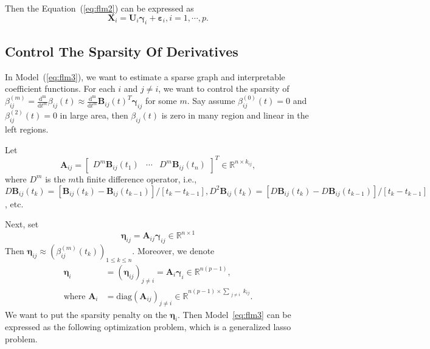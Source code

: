 \documentclass[11pt]{article}
\newcommand{\R}{\mathbb R}
\newcommand{\bX}{\mathbf X}
\newcommand{\bA}{\mathbf A}
\newcommand{\bB}{\mathbf B}
\newcommand{\bU}{\mathbf U}
\newcommand{\bseta}{\boldsymbol{\eta}}
\newcommand{\bvarepsilon}{\boldsymbol{\varepsilon}}
\newcommand{\bgamma}{\boldsymbol{\gamma}}
\begin{document}
Then the Equation~(\ref{eq:flm2}) can be expressed as
\begin{equation}
	\label{eq:flm3}
	\bX_i = \bU_i \bgamma_i + \bvarepsilon_i, i = 1, \cdots, p.
\end{equation}
 
\subsection{Control The Sparsity Of Derivatives}

In Model~(\ref{eq:flm3}), we want to estimate a sparse graph and interpretable coefficient functions. For each $i$ and $j \neq i$, we want to control the sparsity of $ \beta_{ij}^{(m)} = \frac{\mathrm{d^m}}{\mathrm{d} t^m} \beta_{ij}(t) \approx \frac{\mathrm{d^m}}{\mathrm{d} t^m} \bB_{ij}(t)^T \bgamma_{ij}$ for some $m$. Say assume $\beta_{ij}^{(0)}(t) = 0$ and $\beta_{ij}^{(2)}(t) = 0$ in large area, then $\beta_{ij}(t)$ is zero in many region and linear in the left regions.

Let 
\begin{equation}
	\bA_{ij} = \begin{bmatrix} D^m\bB_{ij}(t_1) & \cdots & D^m\bB_{ij}(t_n) \end{bmatrix}^T \in \R^{n \times k_{ij}},
\end{equation} 
where $D^m$ is the $m$th finite difference operator, i.e., $D\bB_{ij}(t_k) = [\bB_{ij}(t_k) - \bB_{ij}(t_{k-1})]/[t_k - t_{k-1}], D^2\bB_{ij}(t_k) = [D\bB_{ij}(t_k) - D\bB_{ij}(t_{k-1})]/[t_k - t_{k-1}]$, etc. 

Next, set
\begin{equation}
	\bseta_{ij} = \bA_{ij} \bgamma_{ij} \in \R^{n \times 1}  
\end{equation}
Then $\bseta_{ij} \approx (\beta_{ij}^{(m)}(t_k))_{1 \leq k \leq n}$. Moreover, we denote 
\begin{equation}
	\begin{aligned}
	\bseta_i &= (\bseta_{ij})_{j \neq i} = \bA_i \bgamma_i \in \R^{n(p-1)},\\
    \text{where }\bA_i&= \text{diag}(\bA_{ij})_{j \neq i} \in \R^{n(p-1)  \times \sum_{\substack{j \neq i}} k_{ij} }.
	\end{aligned}
\end{equation}
We want to put the sparsity penalty on the $\bseta_i$. Then Model~\ref{eq:flm3} can be expressed as the following optimization problem, which is a generalized lasso problem. 
\end{document}
